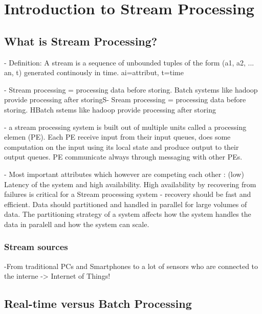 \chapter{Introduction to Stream Processing}

\section{What is Stream Processing?}
- Definition: A stream is a sequence of unbounded tuples of the form (a1, a2,
... an, t) generated continously in time. ai=attribut, t=time

- Stream processing = processing data before storing. Batch systems like hadoop
provide processing after storingS- Sream processing = processing data before
storing. HBatch sstems like hadoop provide processing after storing  

- a stream processing system is built out of multiple units called a processing
elemen (PE). Each PE receive input from their input queues, does some
computation on the input using its local state and produce output to their
output queues. PE communicate always through messaging with other PEs.

- Most important attributes which however are competing each other : (low)
Latency of the system and high availability. High availability by recovering
from failures is critical for a Stream processing system - recovery should be
fast and efficient. Data should partitioned and handled in parallel for large
volumes of data. The partitioning strategy of a system  affects how the system
handles the data in paralell and how the system can scale. 

\subsection{Stream sources}
-From traditional PCs and Smartphones to a lot of sensors who are connected to
the interne -> Internet of Things!

\section{Real-time versus Batch Processing}

